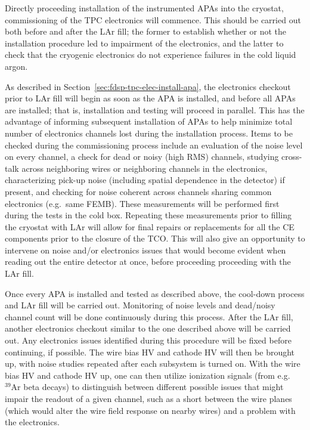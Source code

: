 Directly proceeding installation of the instrumented APAs into the cryostat, commissioning of the
TPC electronics will commence.  This should be carried out both before and after the LAr fill;
the former to establish whether or not the installation procedure led to impairment of the
electronics, and the latter to check that the cryogenic electronics do not experience failures
in the cold liquid argon.

As described in Section~\ref{sec:fdsp-tpc-elec-install-apa}, the electronics checkout prior to
LAr fill will begin as soon as the APA is installed, and before all APAs are installed; that is,
installation and testing will proceed in parallel.  This has the advantage of informing
subsequent installation of APAs to help minimize total number of electronics channels lost
during the installation process.  Items to be checked during the commissioning process include
an evaluation of the noise level on every channel, a check for dead or noisy (high RMS) channels,
studying cross-talk across neighboring wires or neighboring channels in the electronics,
characterizing pick-up noise (including spatial dependence in the detector) if present, and
checking for noise coherent across channels sharing common electronics (e.g.~same FEMB).
These measurements will be performed first during the tests in the cold box.  Repeating these
measurements prior to filling the cryostat with LAr will allow for final repairs or replacements
for all the CE components prior to the closure of the TCO. This will also give an opportunity
to intervene on noise and/or electronics issues that would become evident when reading out
the entire detector at once, before proceeding proceeding with the LAr fill.

Once every APA is installed and tested as described above, the cool-down process and LAr fill
will be carried out.  Monitoring of noise levels and dead/noisy channel count will be
done continuously during this process.  After the LAr fill, another electronics checkout
similar to the one described above will be carried out.  Any electronics issues identified
during this procedure will be fixed before continuing, if possible.  The wire bias HV and
cathode HV will then be brought up, with noise studies repeated after each subsystem is
turned on.  With the wire bias HV and cathode HV up, one can then utilize ionization signals
(from e.g.~$\mathrm{{}^{39}Ar}$ beta decays) to distinguish between different possible issues
that might impair the readout of a given channel, such as a short between the wire planes
(which would alter the wire field response on nearby wires) and a problem with the electronics.

